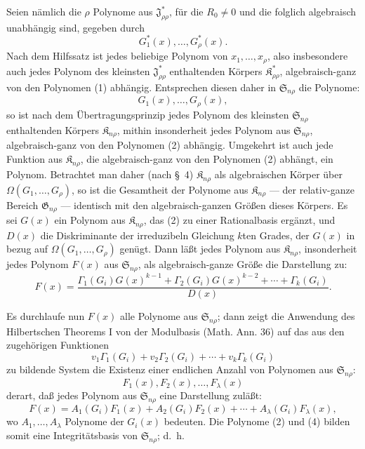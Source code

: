 \documentclass[11pt]{article}
\providecommand{\Kfield}{\mathfrak{K}}
\providecommand{\Ssys}{\mathfrak{S}}
\providecommand{\Jdom}{\mathfrak{J}}
\providecommand{\Gdom}{\mathfrak{G}}
\begin{document}
Seien nämlich die $\rho$ Polynome aus $\Jdom^*_{\rho\rho}$, für die $R_0\ne0$ und die folglich algebraisch unabhängig sind, gegeben durch
\begin{equation}
  G_1^*(x),\ldots,G_\rho^*(x).
\tag{1}
\end{equation}
Nach dem Hilfssatz ist jedes beliebige Polynom von $x_1,
\ldots,x_\rho$, also insbesondere auch jedes Polynom des kleinsten $\Jdom^*_{\rho\rho}$ enthaltenden Körpers $\Kfield^*_{\rho\rho}$, algebraisch-ganz von den Polynomen (1) abhängig. Entsprechen diesen daher in $\Ssys_{n\rho}$ die Polynome:
\begin{equation}
  G_1(x),\ldots,G_\rho(x),
\tag{2}
\end{equation}
so ist nach dem Übertragungsprinzip jedes Polynom des kleinsten $\Ssys_{n\rho}$ enthaltenden Körpers $\Kfield_{n\rho}$, mithin insonderheit jedes Polynom aus $\Ssys_{n\rho}$, algebraisch-ganz von den Polynomen (2) abhängig. Umgekehrt ist auch jede Funktion aus $\Kfield_{n\rho}$, die algebraisch-ganz von den Polynomen (2) abhängt, ein Polynom. Betrachtet man daher (nach \S\ 4) $\Kfield_{n\rho}$ als algebraischen Körper über $\Omega(G_1,
\ldots,G_\rho)$, so ist die Gesamtheit der Polynome aus $\Kfield_{n\rho}$ --- der relativ-ganze Bereich $\Gdom_{n\rho}$ --- identisch mit den algebraisch-ganzen Größen dieses Körpers. Es sei $G(x)$ ein Polynom aus $\Kfield_{n\rho}$, das (2) zu einer Rationalbasis ergänzt, und $D(x)$ die Diskriminante der irreduzibeln Gleichung $k$ten Grades, der $G(x)$ in bezug auf $\Omega(G_1,
\ldots,G_\rho)$ genügt. Dann läßt jedes Polynom aus $\Kfield_{n\rho}$, insonderheit jedes Polynom $F(x)$ aus $\Ssys_{n\rho}$, als algebraisch-ganze Größe die Darstellung zu:
\begin{equation}
  F(x)=\frac{\Gamma_1(G_i)G(x)^{k-1}+\Gamma_2(G_i)G(x)^{k-2}+\cdots+\Gamma_k(G_i)}{D(x)}.
\tag{3}
\end{equation}

Es durchlaufe nun $F(x)$ alle Polynome aus $\Ssys_{n\rho}$; dann zeigt die Anwendung des Hilbertschen Theorems I von der Modulbasis (Math. Ann. 36) auf das aus den zugehörigen Funktionen
\[
  v_1\Gamma_1(G_i)+v_2\Gamma_2(G_i)+\cdots+v_k\Gamma_k(G_i)
\]
zu bildende System die Existenz einer endlichen Anzahl von Polynomen aus $\Ssys_{n\rho}$:
\begin{equation}
  F_1(x),F_2(x),\ldots,F_\lambda(x)
\tag{4}
\end{equation}
derart, daß jedes Polynom aus $\Ssys_{n\rho}$ eine Darstellung zuläßt:
\begin{equation}
  F(x)=A_1(G_i)F_1(x)+A_2(G_i)F_2(x)+\cdots+A_\lambda(G_i)F_\lambda(x),
\tag{5}
\end{equation}
wo $A_1,
\ldots,A_\lambda$ Polynome der $G_i(x)$ bedeuten. Die Polynome (2) und (4) bilden somit eine Integritätsbasis von $\Ssys_{n\rho}$; d.~h.
\end{document}
